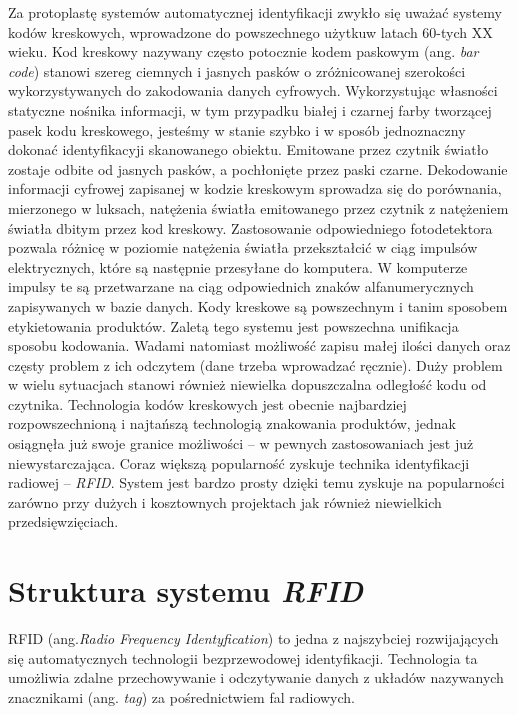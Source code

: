 Za protoplastę systemów automatycznej identyfikacji zwykło się uważać systemy kodów kreskowych, wprowadzone do powszechnego użytkuw latach 60-tych XX wieku.
Kod kreskowy nazywany często potocznie kodem paskowym (ang. \emph{bar code}) stanowi szereg ciemnych i jasnych pasków o zróżnicowanej szerokości wykorzystywanych do zakodowania danych cyfrowych. Wykorzystując własności statyczne nośnika informacji, w tym przypadku białej i czarnej farby tworzącej pasek kodu kreskowego, jesteśmy w stanie szybko i w sposób jednoznaczny dokonać identyfikacyji skanowanego obiektu. Emitowane przez czytnik światło zostaje odbite od jasnych pasków, a pochłonięte przez paski czarne. Dekodowanie informacji cyfrowej zapisanej w kodzie kreskowym sprowadza się do porównania, mierzonego w luksach, natężenia światła emitowanego przez czytnik z natężeniem światła dbitym przez kod kreskowy. Zastosowanie odpowiedniego fotodetektora pozwala różnicę w poziomie natężenia światła przekształcić w ciąg impulsów elektrycznych, które są następnie przesyłane do komputera. W komputerze impulsy te są przetwarzane na ciąg odpowiednich znaków alfanumerycznych zapisywanych w bazie danych. 
Kody kreskowe są powszechnym i tanim sposobem etykietowania produktów. Zaletą tego systemu jest powszechna unifikacja sposobu kodowania. Wadami  natomiast możliwość zapisu małej ilości danych  oraz częsty problem z ich odczytem (dane trzeba wprowadzać ręcznie). Duży problem w wielu sytuacjach stanowi również niewielka dopuszczalna odległość kodu od czytnika. 
Technologia kodów kreskowych jest obecnie najbardziej rozpowszechnioną i najtańszą technologią znakowania produktów, jednak osiągnęła już swoje granice możliwości – w pewnych zastosowaniach jest już niewystarczająca.
Coraz większą popularność zyskuje technika identyfikacji radiowej – \emph{RFID}. System jest bardzo prosty dzięki temu zyskuje na popularności zarówno przy dużych i kosztownych projektach jak również  niewielkich przedsięwzięciach.

\section{Struktura systemu \emph{RFID}}

RFID (ang.\emph {Radio Frequency  Identyfication}) to jedna z najszybciej rozwijających  się automatycznych technologii bezprzewodowej  identyfikacji. Technologia ta umożliwia zdalne przechowywanie i odczytywanie danych z układów nazywanych znacznikami (ang. \emph{tag}) za pośrednictwiem fal radiowych. 

